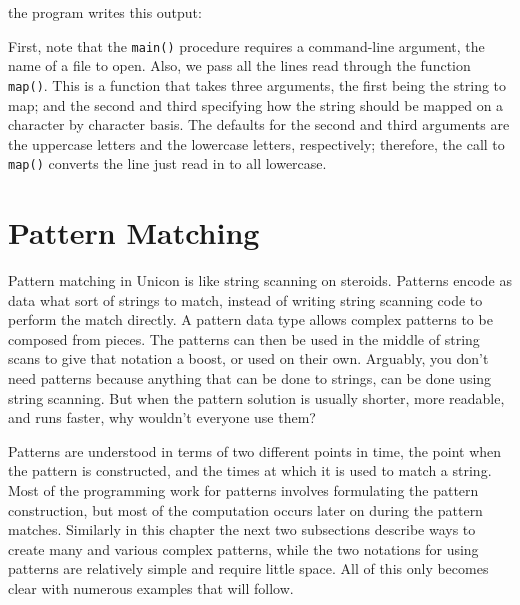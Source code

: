 \noindent the program writes this output: 


First, note that the \texttt{main()} procedure requires a command-line
argument, the name of a file to open. Also, we pass all the lines read
through the function \texttt{map()}. This is a function that takes
three arguments, the first being the string to map; and the second and
third specifying how the string should be mapped on a character by
character basis. The defaults for the second and third arguments are
the uppercase letters and the lowercase letters, respectively;
therefore, the call to \texttt{map()} converts the line just read in to
all lowercase.

\section{Pattern Matching}

Pattern matching in Unicon is like string scanning on steroids.
Patterns encode as data what sort of strings to match, instead of writing
string scanning code to perform the match directly.  A
pattern data type allows complex patterns to be composed from pieces.
The patterns can then be used in the middle of string scans to give
that notation a boost, or used on their own. Arguably, you don't need
patterns because anything that can be done to strings, can be done
using string scanning. But when the pattern solution is usually
shorter, more readable, and runs faster, why wouldn't everyone use them?

Patterns are understood in terms of two different points in time, the
point when the pattern is constructed, and the times at which it is
used to match a string.  Most of the programming work for patterns
involves formulating the pattern construction, but most of the
computation occurs later on during the pattern matches.  Similarly in
this chapter the next two subsections describe ways to
create many and various complex patterns, while the two notations for
using patterns are relatively simple and require little space.  All of
this only becomes clear with numerous examples that will follow.


